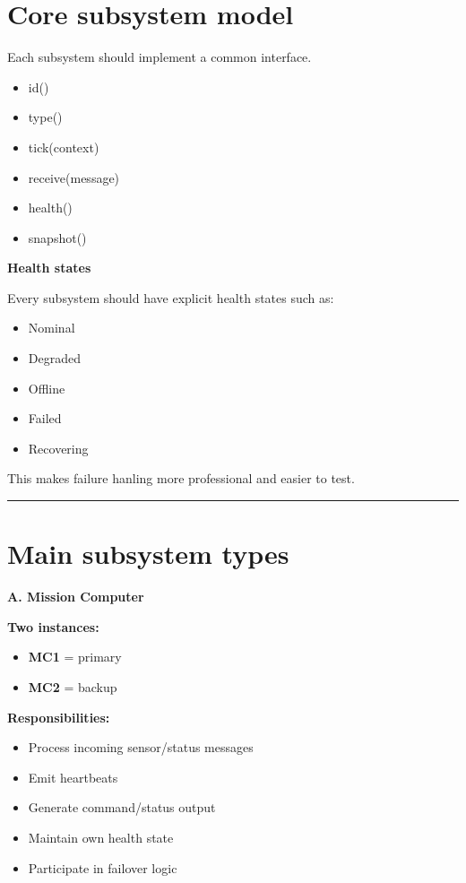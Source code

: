 \documentclass{report}
\begin{document}
\section{Core subsystem model}

Each subsystem should implement a common interface. 

\begin{itemize}
   \item id()
   \item type()
   \item tick(context)
   \item receive(message)
   \item health()
   \item snapshot()
\end{itemize}

\textbf{Health states}

Every subsystem should have explicit health states such as:
\begin{itemize}
   \item Nominal
   \item Degraded
   \item Offline
   \item Failed
   \item Recovering
\end{itemize}

This makes failure hanling more professional and easier to test.

\begin{center}
\rule{0.9\textwidth}{1pt}
\end{center}
\section{Main subsystem types}

\textbf{A. Mission Computer}

\textbf{Two instances:}
\begin{itemize}
   \item \textbf{MC1} = primary
   \item \textbf{MC2} = backup
\end{itemize}

\textbf{Responsibilities:}
\begin{itemize}
   \item Process incoming sensor/status messages
   \item Emit heartbeats
   \item Generate command/status output
   \item Maintain own health state
   \item Participate in failover logic
\end{itemize}
\end{document}
